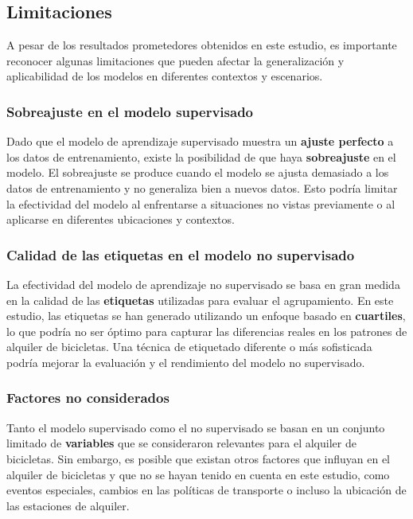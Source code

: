 \documentclass{wsdcr}
\begin{document}
\subsection{Limitaciones}

A pesar de los resultados prometedores obtenidos en este estudio, es importante reconocer algunas limitaciones que pueden afectar la generalización y aplicabilidad de los modelos en diferentes contextos y escenarios.

\subsubsection{Sobreajuste en el modelo supervisado}

Dado que el modelo de aprendizaje supervisado muestra un \textbf{ajuste perfecto} a los datos de entrenamiento, existe la posibilidad de que haya \textbf{sobreajuste} en el modelo. El sobreajuste se produce cuando el modelo se ajusta demasiado a los datos de entrenamiento y no generaliza bien a nuevos datos. Esto podría limitar la efectividad del modelo al enfrentarse a situaciones no vistas previamente o al aplicarse en diferentes ubicaciones y contextos.

\subsubsection{Calidad de las etiquetas en el modelo no supervisado}

La efectividad del modelo de aprendizaje no supervisado se basa en gran medida en la calidad de las \textbf{etiquetas} utilizadas para evaluar el agrupamiento. En este estudio, las etiquetas se han generado utilizando un enfoque basado en \textbf{cuartiles}, lo que podría no ser óptimo para capturar las diferencias reales en los patrones de alquiler de bicicletas. Una técnica de etiquetado diferente o más sofisticada podría mejorar la evaluación y el rendimiento del modelo no supervisado.

\subsubsection{Factores no considerados}

Tanto el modelo supervisado como el no supervisado se basan en un conjunto limitado de \textbf{variables} que se consideraron relevantes para el alquiler de bicicletas. Sin embargo, es posible que existan otros factores que influyan en el alquiler de bicicletas y que no se hayan tenido en cuenta en este estudio, como eventos especiales, cambios en las políticas de transporte o incluso la ubicación de las estaciones de alquiler.
\end{document}
